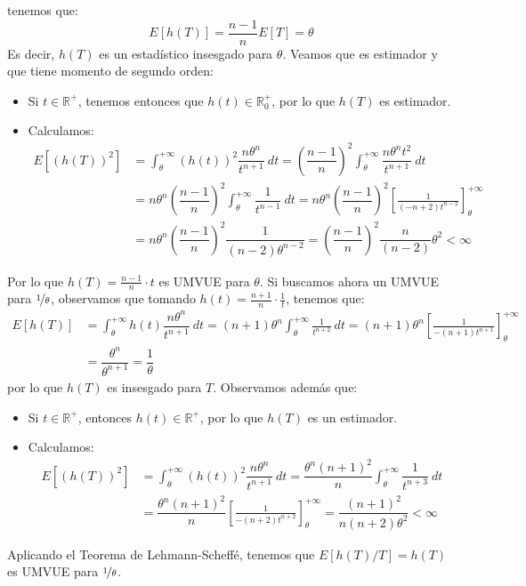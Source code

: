 \begin{ejercicio}
    tenemos que:
    \begin{equation*}
        E[h(T)] = \dfrac{n-1}{n}E[T] = \theta
    \end{equation*}
    Es decir, $h(T)$ es un estadístico insesgado para $\theta$. Veamos que es estimador y que tiene momento de segundo orden:
    \begin{itemize}
        \item Si $t\in \mathbb{R}^+$, tenemos entonces que $h(t) \in \mathbb{R}^+_0$, por lo que $h(T)$ es estimador.
        \item Calculamos:
            \begin{align*}
                E[{(h(T))}^{2}] &= \int_{\theta}^{+\infty} {(h(t))}^{2}\dfrac{n\theta^n}{t^{n+1}}~dt  = {\left(\dfrac{n-1}{n}\right)}^{2}\int_{\theta}^{+\infty} \dfrac{n\theta^n t^2}{t^{n+1}}~dt  \\ 
                                &= n\theta^n {\left(\dfrac{n-1}{n}\right)}^{2}\int_{\theta}^{+\infty} \dfrac{1}{t^{n-1}}~dt  = n\theta^n {\left(\dfrac{n-1}{n}\right)}^{2} \left[\frac{1}{(-n+2)t^{n-2}}\right]_\theta^{+\infty} \\
                                &= n\theta^n {\left(\dfrac{n-1}{n}\right)}^{2}\dfrac{1}{(n-2)\theta^{n-2}} = {\left(\dfrac{n-1}{n}\right)}^{2} \dfrac{n}{(n-2)}\theta^2 < \infty
            \end{align*}
    \end{itemize}
    Por lo que $h(T) = \frac{n-1}{n}\cdot t$ es UMVUE para $\theta$. Si buscamos ahora un UMVUE para $\nicefrac{1}{\theta}$, observamos que tomando $h(t) = \frac{n+1}{n}\cdot \frac{1}{t}$, tenemos que:
    \begin{align*}
        E[h(T)] &= \int_{\theta}^{+\infty} h(t) \dfrac{n\theta^n}{t^{n+1}}~dt  = (n+1)\theta^n \int_{\theta}^{+\infty} \frac{1}{t^{n+2}}~dt  = (n+1)\theta^n \left[\frac{1}{-(n+1)t^{n+1}}\right]_\theta^{+\infty} \\
                &= \dfrac{\theta^n}{\theta^{n+1}} = \dfrac{1}{\theta}
    \end{align*}
    por lo que $h(T)$ es insesgado para $T$. Observamos además que:
    \begin{itemize}
        \item Si $t\in \mathbb{R}^+$, entonces $h(t)\in \mathbb{R}^+$, por lo que $h(T)$ es un estimador.
        \item Calculamos:
            \begin{align*}
                E[{(h(T))}^{2}] &= \int_{\theta}^{+\infty} {(h(t))}^{2}\dfrac{n\theta^n}{t^{n+1}}~dt  = \dfrac{\theta^n{(n+1)}^{2}}{n}\int_{\theta}^{+\infty} \dfrac{1}{t^{n+3}}~dt  \\
                &= \dfrac{\theta^n{(n+1)}^{2}}{n} \left[\frac{1}{-(n+2)t^{n+2}}\right]_\theta^{+\infty} = \dfrac{{(n+1)}^{2}}{n(n+2)\theta^2} < \infty
            \end{align*}
    \end{itemize}
    Aplicando el Teorema de Lehmann-Scheffé, tenemos que $E[h(T)/T] = h(T)$ es UMVUE para $\nicefrac{1}{\theta}$.
\end{ejercicio}

